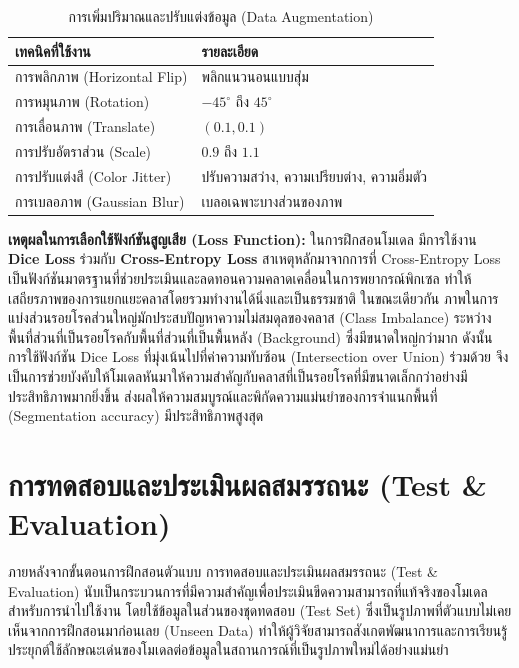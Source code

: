 \begin{table}[hbt!]
\centering
\caption{การเพิ่มปริมาณและปรับแต่งข้อมูล (Data Augmentation)}
\label{tab:data_augmentation}
\begin{tabular}{|l|l|}
\hline
\textbf{เทคนิคที่ใช้งาน} & \textbf{รายละเอียด} \\
\hline
การพลิกภาพ (Horizontal Flip) & พลิกแนวนอนแบบสุ่ม \\
การหมุนภาพ (Rotation) & $-45^{\circ}$ ถึง $45^{\circ}$ \\
การเลื่อนภาพ (Translate) & $(0.1, 0.1)$ \\
การปรับอัตราส่วน (Scale) & $0.9$ ถึง $1.1$ \\
การปรับแต่งสี (Color Jitter) & ปรับความสว่าง, ความเปรียบต่าง, ความอิ่มตัว \\
การเบลอภาพ (Gaussian Blur) & เบลอเฉพาะบางส่วนของภาพ \\
\hline
\end{tabular}
\end{table}

\textbf{เหตุผลในการเลือกใช้ฟังก์ชันสูญเสีย (Loss Function):}
ในการฝึกสอนโมเดล มีการใช้งาน \textbf{Dice Loss} ร่วมกับ \textbf{Cross-Entropy Loss} สาเหตุหลักมาจากการที่ Cross-Entropy Loss เป็นฟังก์ชันมาตรฐานที่ช่วยประเมินและลดทอนความคลาดเคลื่อนในการพยากรณ์พิกเซล ทำให้เสถียรภาพของการแยกแยะคลาสโดยรวมทำงานได้นิ่งและเป็นธรรมชาติ ในขณะเดียวกัน ภาพในการแบ่งส่วนรอยโรคส่วนใหญ่มักประสบปัญหาความไม่สมดุลของคลาส (Class Imbalance) ระหว่างพื้นที่ส่วนที่เป็นรอยโรคกับพื้นที่ส่วนที่เป็นพื้นหลัง (Background) ซึ่งมีขนาดใหญ่กว่ามาก ดังนั้น การใช้ฟังก์ชัน Dice Loss ที่มุ่งเน้นไปที่ค่าความทับซ้อน (Intersection over Union) ร่วมด้วย จึงเป็นการช่วยบังคับให้โมเดลหันมาให้ความสำคัญกับคลาสที่เป็นรอยโรคที่มีขนาดเล็กกว่าอย่างมีประสิทธิภาพมากยิ่งขึ้น ส่งผลให้ความสมบูรณ์และพิกัดความแม่นยำของการจำแนกพื้นที่ (Segmentation accuracy) มีประสิทธิภาพสูงสุด

\section{การทดสอบและประเมินผลสมรรถนะ (Test \& Evaluation)}

ภายหลังจากขั้นตอนการฝึกสอนตัวแบบ การทดสอบและประเมินผลสมรรถนะ (Test \& Evaluation) นับเป็นกระบวนการที่มีความสำคัญเพื่อประเมินขีดความสามารถที่แท้จริงของโมเดลสำหรับการนำไปใช้งาน โดยใช้ข้อมูลในส่วนของชุดทดสอบ (Test Set) ซึ่งเป็นรูปภาพที่ตัวแบบไม่เคยเห็นจากการฝีกสอนมาก่อนเลย (Unseen Data) ทำให้ผู้วิจัยสามารถสังเกตพัฒนาการและการเรียนรู้ประยุกต์ใช้ลักษณะเด่นของโมเดลต่อข้อมูลในสถานการณ์ที่เป็นรูปภาพใหม่ได้อย่างแม่นยำ

